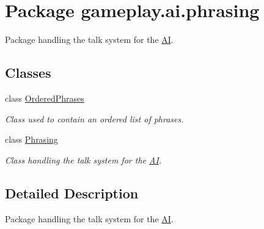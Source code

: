 \hypertarget{a00084}{\section{Package gameplay.\-ai.\-phrasing}
\label{a00084}
}


Package handling the talk system for the \hyperlink{a00001}{A\-I}.  


\subsection*{Classes}
\begin{DoxyCompactItemize}
\item 
class \hyperlink{a00016}{Ordered\-Phrases}
\begin{DoxyCompactList}\small\item\em Class used to contain an ordered list of phrases. \end{DoxyCompactList}\item 
class \hyperlink{a00018}{Phrasing}
\begin{DoxyCompactList}\small\item\em Class handling the talk system for the \hyperlink{a00001}{A\-I}. \end{DoxyCompactList}\end{DoxyCompactItemize}


\subsection{Detailed Description}
Package handling the talk system for the \hyperlink{a00001}{A\-I}. 